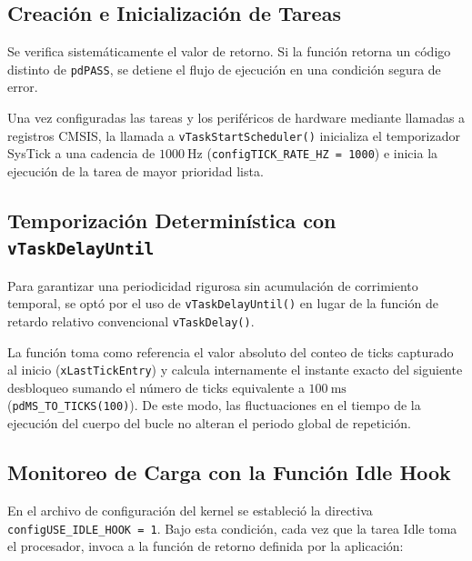 \subsection{Creación e Inicialización de Tareas}



Se verifica sistemáticamente el valor de retorno. Si la función retorna un código distinto de \texttt{pdPASS}, se
detiene el flujo de ejecución en una condición segura de error.

Una vez configuradas las tareas y los periféricos de hardware mediante llamadas a registros CMSIS, la llamada a
\texttt{vTaskStartScheduler()} inicializa el temporizador SysTick a una cadencia de $\SI{1000}{\hertz}$
(\texttt{configTICK\_RATE\_HZ = 1000}) e inicia la ejecución de la tarea de mayor prioridad lista.

\subsection{Temporización Determinística con \texttt{vTaskDelayUntil}}

Para garantizar una periodicidad rigurosa sin acumulación de corrimiento temporal, se optó por el uso de
\texttt{vTaskDelayUntil()} en lugar de la función de retardo relativo convencional \texttt{vTaskDelay()}.



La función toma como referencia el valor absoluto del conteo de ticks capturado al inicio (\texttt{xLastTickEntry})
y calcula internamente el instante exacto del siguiente desbloqueo sumando el número de ticks equivalente a
$\SI{100}{\milli\second}$ (\texttt{pdMS\_TO\_TICKS(100)}). De este modo, las fluctuaciones en el tiempo de
la ejecución del cuerpo del bucle no alteran el periodo global de repetición.

\subsection{Monitoreo de Carga con la Función Idle Hook}

En el archivo de configuración del kernel se estableció la directiva \texttt{configUSE\_IDLE\_HOOK = 1}. Bajo esta
condición, cada vez que la tarea Idle toma el procesador, invoca a la función de retorno definida por la aplicación:

